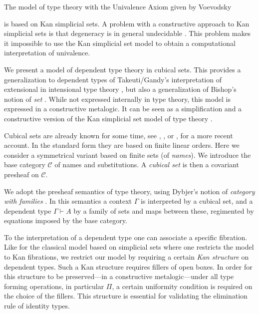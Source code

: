 \documentclass[10pt,a4paper]{article}
\newcommand{\CC}{{\mathcal C}}
\begin{document}
The model of type theory with the Univalence Axiom given by Voevodsky

\cite{Voevodsky} is based on Kan simplicial sets.
A problem with a constructive approach to
Kan simplicial sets is that degeneracy is in general undecidable \cite{BC}.
This problem makes it impossible to use the Kan simplicial set model
to obtain a computational interpretation of univalence.

We present a model of dependent type theory in cubical sets.  This
provides a generalization to dependent types of Takeuti/Gandy's
interpretation of extensional in intensional type theory \cite{Gandy},
but also a generalization of Bishop's notion of {\em set}
\cite{Bishop}.  While not expressed internally in type theory, this
model is expressed in a constructive metalogic.  It can be seen as a
simplification and a constructive version of the Kan simplicial set
model of type theory \cite{Voevodsky}.

Cubical sets are already known for some time, see \cite{Serre}, \cite{Kan},
or \cite{Crans}, \cite{Williamson} for a more recent account.
In the standard form they are based on finite linear orders.
Here we consider a symmetrical variant based on finite sets (of \emph{names}).
We introduce the base category $\CC$ of names and substitutions.
A \emph{cubical set} is then a covariant presheaf on $\CC$.

We adopt the presheaf semantics of type theory, using Dybjer's notion
of \emph{category with families} \cite{Dybjer}.  In this semantics a
context $\Gamma$ is interpreted by a cubical set, and a dependent type
$\Gamma\vdash A$ by a family of sets and maps between these,
regimented by equations imposed by the base category.



To the interpretation of a dependent type one can associate a specific
fibration.  Like for the classical model based on simplicial sets
where one restricts the model to Kan fibrations, we restrict our model
by requiring a certain \emph{Kan structure} on dependent types.  Such
a Kan structure requires fillers of open boxes.  In order for this
structure to be preserved---in a constructive metalogic---under all
type forming operations, in particular $\Pi$, a certain uniformity
condition is required on the choice of the fillers. This structure is
essential for validating the elimination rule of identity types.
\end{document}
